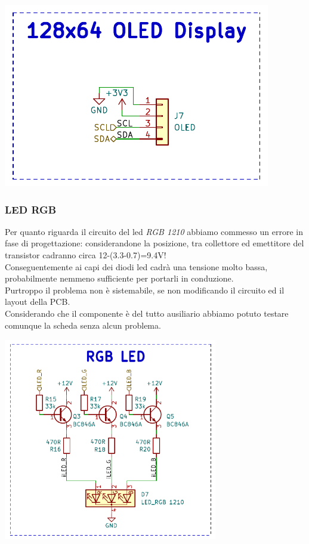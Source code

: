 \begin{center}
\includegraphics[scale=0.7]{figures/image58.png}
\captionsetup{type=figure}
\end{center}

\hypertarget{led-rgb}{%
\subsubsection{\texorpdfstring{LED RGB}{LED RGB}}\label{led-rgb}}

Per quanto riguarda il circuito del led \emph{RGB 1210} abbiamo commesso
un errore in fase di progettazione: considerandone la posizione, tra
collettore ed emettitore del transistor cadranno circa
12-(3.3-0.7)=9.4V!\\
Conseguentemente ai capi dei diodi led cadrà una tensione molto bassa,
probabilmente nemmeno sufficiente per portarli in conduzione.\\
Purtroppo il problema non è sistemabile, se non modificando il circuito
ed il layout della PCB.\\
Considerando che il componente è del tutto ausiliario abbiamo potuto
testare comunque la scheda senza alcun problema.

\begin{center}
\includegraphics[width=3.68946in,height=3.49479in]{figures/image17.png}
\captionsetup{type=figure}
\end{center}

